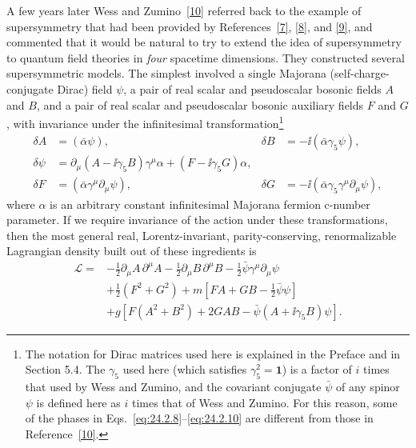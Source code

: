 A few years later Wess and Zumino~\hyperref[ch24-ref-10]{[10]} referred back
to the example of supersymmetry that had been provided by
References~\hyperref[ch24-ref-7]{[7]}, \hyperref[ch24-ref-8]{[8]}, and
\hyperref[ch24-ref-9]{[9]}, and commented that it would be natural to try to
extend the idea of supersymmetry to quantum field theories in \emph{four}
spacetime dimensions. They constructed several supersymmetric models. The
simplest involved a single Majorana (self-charge-conjugate Dirac) field
\(\psi\), a pair of real scalar and pseudoscalar bosonic fields \(A\) and
\(B\), and a pair of real scalar and pseudoscalar bosonic auxiliary fields
\(F\) and \(G\), with invariance under the infinitesimal
transformation\footnote{The notation for Dirac matrices used here is explained
in the Preface and in Section 5.4. The \(\gamma_5\) used here (which satisfies
\(\gamma_5^2=\mathbf{1}\)) is a factor of \(i\) times that used by Wess and Zumino, and
the covariant conjugate \(\bar\psi\) of any spinor \(\psi\) is defined here as
\(i\) times that of Wess and Zumino. For this reason, some of the phases in
Eqs.~\eqref{eq:24.2.8}--\eqref{eq:24.2.10} are different from those in
Reference~\hyperref[ch24-ref-10]{[10]}.}
\begin{equation}
\begin{aligned}
\delta A&=(\bar\alpha\psi),
&
\delta B&=-\ii(\bar\alpha\gamma_5\psi),
\\
\delta\psi
&=\partial_\mu(A-\ii\gamma_5B)\gamma^\mu\alpha
+(F-\ii\gamma_5G)\alpha,
\\
\delta F&=(\bar\alpha\gamma^\mu\partial_\mu\psi),
&
\delta G&=-\ii(\bar\alpha\gamma_5\gamma^\mu\partial_\mu\psi),
\end{aligned}
\tag{24.2.8}\label{eq:24.2.8}
\end{equation}
where \(\alpha\) is an arbitrary constant infinitesimal Majorana fermion
c-number parameter. If we require invariance of the action under these
transformations, then the most general real, Lorentz-invariant,
parity-conserving, renormalizable Lagrangian density built out of these
ingredients is
\begin{equation}
\begin{aligned}
\mathcal L={}&
-\frac12\partial_\mu A\,\partial^\mu A
-\frac12\partial_\mu B\,\partial^\mu B
-\frac12\bar\psi\gamma^\mu\partial_\mu\psi
\\
&+\frac12(F^2+G^2)
+m\left[FA+GB-\frac12\bar\psi\psi\right]
\\
&+g\left[
F(A^2+B^2)+2GAB-\bar\psi(A+\ii\gamma_5B)\psi
\right].
\end{aligned}
\tag{24.2.9}\label{eq:24.2.9}
\end{equation}
